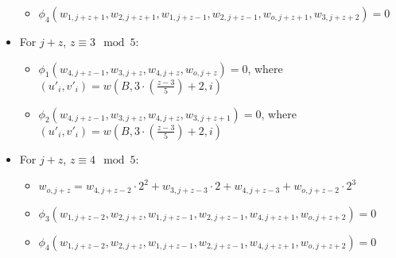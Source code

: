 \begin{itemize}
\begin{itemize}
            \item $\phi_4(w_{1, j + z + 1}, w_{2, j + z + 1}, w_{1, j + z - 1}, w_{2, j + z - 1}, w_{o, j + z + 1}, w_{3, j + z + 2}) = 0$
        \end{itemize}
    \item For $j + z$, $z \equiv 3 \mod 5$:
        \begin{itemize}
            \item $\phi_1(w_{4, j + z - 1}, w_{3, j + z}, w_{4, j + z}, w_{o, j + z}) = 0$, where $(u'_{i}, v'_{i}) = w(B, 3 \cdot (\frac{z - 3}{5}) + 2, i)$
            \item $\phi_2(w_{4, j + z - 1}, w_{3, j + z}, w_{4, j + z}, w_{3, j + z + 1}) = 0$, where $(u'_{i}, v'_{i}) = w(B, 3 \cdot (\frac{z - 3}{5}) + 2, i)$
        \end{itemize}
    \item For $j + z$, $z \equiv 4 \mod 5$:
        \begin{itemize}
            \item $w_{o, j + z} = w_{4,j + z - 2} \cdot 2^2 + w_{3,j + z - 3} \cdot 2 + w_{4, j + z - 3} + w_{o, j + z - 2} \cdot 2^3$
            \item $\phi_3(w_{1, j + z - 2}, w_{2, j + z}, w_{1, j + z - 1}, w_{2, j + z - 1}, w_{4, j + z + 1}, w_{o, j + z + 2}) = 0$
            \item $\phi_4(w_{1, j + z - 2}, w_{2, j + z}, w_{1, j + z - 1}, w_{2, j + z - 1}, w_{4, j + z + 1}, w_{o, j + z + 2}) = 0$
        \end{itemize}
\end{itemize}

